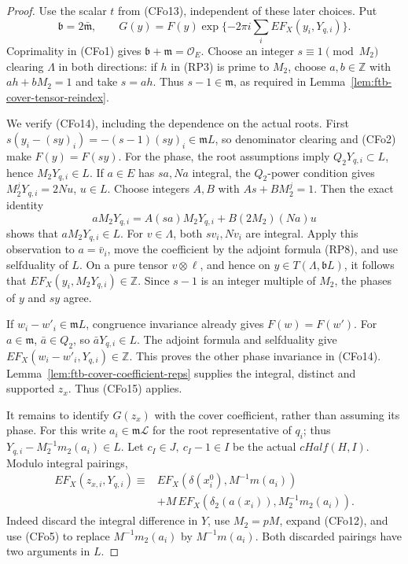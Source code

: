 \begin{proof}
Use the scalar \(t\) from (CFo13), independent of these later
choices. Put
\[
              \mathfrak b=2\bar{\mathfrak m},\qquad
 G(y)=F(y)\exp\{-2\pi i\sum_iEF_X(y_i,Y_{q,i})\}.
\]
Coprimality in (CFo1) gives
\(\mathfrak b+\mathfrak m=\mathcal O_E\).
Choose an integer \(s\equiv1\pmod {M_2}\) clearing \(\Lambda\)
in both directions: if \(h\) in (RP3) is prime to \(M_2\),
choose \(a,b\in\mathbb Z\) with \(ah+bM_2=1\) and take \(s=ah\).
Thus \(s-1\in\mathfrak m\), as required in
Lemma~\ref{lem:ftb-cover-tensor-reindex}.

We verify (CFo14), including the dependence on the actual roots.
First \(s(y_i-(sy)_i)=-(s-1)(sy)_i\in\mathfrak mL\),
so denominator clearing and (CFo2) make \(F(y)=F(sy)\).
For the phase, the root assumptions imply
\(Q_2Y_{q,i}\subset L\), hence \(M_2Y_{q,i}\in L\).
If \(a\in E\) has \(sa,Na\) integral, the
\(Q_2\)-power condition gives \(M_2^jY_{q,i}=2Nu\), \(u\in L\).
Choose integers \(A,B\) with \(As+BM_2^j=1\).
Then the exact identity
\[
 aM_2Y_{q,i}
       =A(sa)M_2Y_{q,i}+B(2M_2)(Na)u
\]
shows that \(aM_2Y_{q,i}\in L\).
For \(v\in\Lambda\), both \(sv_i,Nv_i\) are integral.
Apply this observation to \(a=\bar v_i\), move the coefficient
by the adjoint formula (RP8), and use selfduality of \(L\).
On a pure tensor \(v\otimes\ell\), and hence on
\(y\in T(\Lambda,\mathfrak bL)\), it follows that
\(EF_X(y_i,M_2Y_{q,i})\in\mathbb Z\).
Since \(s-1\) is an integer multiple of \(M_2\),
the phases of \(y\) and \(sy\) agree.

If \(w_i-w'_i\in\mathfrak mL\), congruence invariance
already gives \(F(w)=F(w')\).
For \(a\in\mathfrak m\), \(\bar a\in Q_2\), so
\(\bar aY_{q,i}\in L\).
The adjoint formula and selfduality give
\(EF_X(w_i-w'_i,Y_{q,i})\in\mathbb Z\).
This proves the other phase invariance in (CFo14).
Lemma~\ref{lem:ftb-cover-coefficient-reps} supplies the integral,
distinct and supported \(z_x\). Thus (CFo15) applies.

It remains to identify \(G(z_x)\) with the cover coefficient,
rather than assuming its phase. For this write
\(a_i\in\mathfrak m\mathcal L\) for the root representative
of \(q_i\); thus
\(Y_{q,i}-M_2^{-1}m_2(a_i)\in L\).
Let \(c_I\in J,\ c_I-1\in I\) be the actual \(cHalf(H,I)\).
Modulo integral pairings,
\[
 \begin{split}
 EF_X(z_{x,i},Y_{q,i})\equiv{}&
 EF_X(\delta(x^0_i),M^{-1}m(a_i))\\
 &+M\,EF_X(\delta_2(a(x_i)),M_2^{-1}m_2(a_i)).
 \end{split}                                             \tag{CFo17}
\]
Indeed discard the integral difference in \(Y\), use
\(M_2=pM\), expand (CFo12), and use (CFo5) to replace
\(M^{-1}m_2(a_i)\) by \(M^{-1}m(a_i)\).
Both discarded pairings have two arguments in \(L\).


\end{proof}
